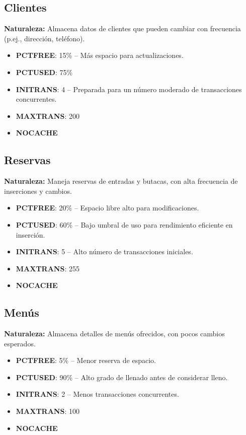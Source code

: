 \subsection{Clientes}
\textbf{Naturaleza:} Almacena datos de clientes que pueden cambiar con frecuencia (p.ej., dirección, teléfono).
\begin{itemize}
    \item \textbf{PCTFREE}: 15\% -- Más espacio para actualizaciones.
    \item \textbf{PCTUSED}: 75\%
    \item \textbf{INITRANS}: 4 -- Preparada para un número moderado de transacciones concurrentes.
    \item \textbf{MAXTRANS}: 200
    \item \textbf{NOCACHE}
\end{itemize}

\subsection{Reservas}
\textbf{Naturaleza:} Maneja reservas de entradas y butacas, con alta frecuencia de inserciones y cambios.
\begin{itemize}
    \item \textbf{PCTFREE}: 20\% -- Espacio libre alto para modificaciones.
    \item \textbf{PCTUSED}: 60\% -- Bajo umbral de uso para rendimiento eficiente en inserción.
    \item \textbf{INITRANS}: 5 -- Alto número de transacciones iniciales.
    \item \textbf{MAXTRANS}: 255
    \item \textbf{NOCACHE}
\end{itemize}

\subsection{Menús}
\textbf{Naturaleza:} Almacena detalles de menús ofrecidos, con pocos cambios esperados.
\begin{itemize}
    \item \textbf{PCTFREE}: 5\% -- Menor reserva de espacio.
    \item \textbf{PCTUSED}: 90\% -- Alto grado de llenado antes de considerar lleno.
    \item \textbf{INITRANS}: 2 -- Menos transacciones concurrentes.
    \item \textbf{MAXTRANS}: 100
    \item \textbf{NOCACHE}
\end{itemize}

